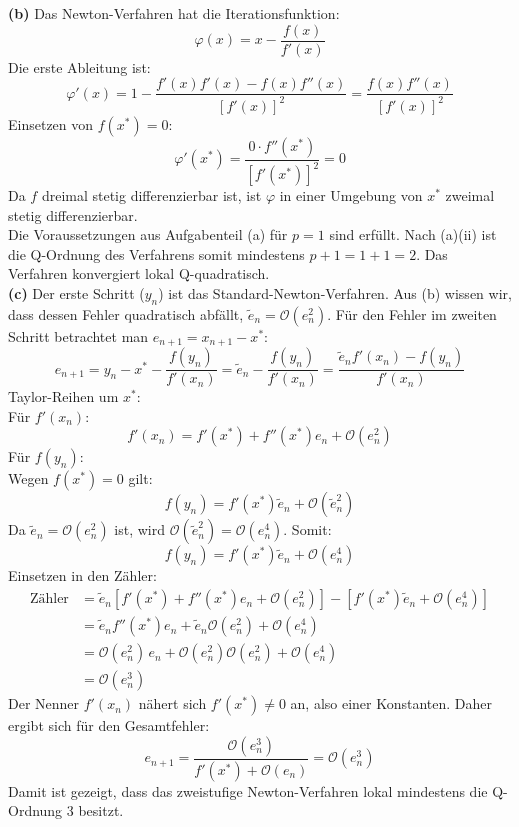 \documentclass[a4paper,12pt]{article}
\begin{document}
\bigskip
\noindent\textbf{(b)}
Das Newton-Verfahren hat die Iterationsfunktion:$$\varphi(x) = x - \frac{f(x)}{f'(x)}$$
Die erste Ableitung ist:
$$\varphi'(x) = 1 - \frac{f'(x)f'(x) - f(x)f''(x)}{[f'(x)]^2} = \frac{f(x)f''(x)}{[f'(x)]^2}$$
Einsetzen von $f(x^*) = 0$:
$$\varphi'(x^*) = \frac{0 \cdot f''(x^*)}{[f'(x^*)]^2} = 0$$
Da $f$ dreimal stetig differenzierbar ist, ist $\varphi$ in einer Umgebung von $x^*$ zweimal stetig differenzierbar. \\ 
Die Voraussetzungen aus Aufgabenteil (a) für $p=1$ sind erfüllt. Nach (a)(ii) ist die Q-Ordnung des Verfahrens somit mindestens $p+1 = 1+1 = 2$. Das Verfahren konvergiert lokal Q-quadratisch. \\

\bigskip
\noindent\textbf{(c)}
Der erste Schritt ($y_n$) ist das Standard-Newton-Verfahren. Aus (b) wissen wir, dass dessen Fehler quadratisch abfällt, $\tilde{e}_n = \mathcal{O}(e_n^2)$.
Für den Fehler im zweiten Schritt betrachtet man $e_{n+1} = x_{n+1} - x^*$:$$e_{n+1} = y_n - x^* - \frac{f(y_n)}{f'(x_n)} = \tilde{e}_n - \frac{f(y_n)}{f'(x_n)} = \frac{\tilde{e}_n f'(x_n) - f(y_n)}{f'(x_n)}$$
Taylor-Reihen um $x^*$: \\
Für $f'(x_n)$:\\
$$f'(x_n) = f'(x^*) + f''(x^*)e_n + \mathcal{O}(e_n^2)$$
Für $f(y_n)$:\\
Wegen $f(x^*) = 0$ gilt:
$$f(y_n) = f'(x^*)\tilde{e}_n + \mathcal{O}(\tilde{e}_n^2)$$
Da $\tilde{e}_n = \mathcal{O}(e_n^2)$ ist, wird $\mathcal{O}(\tilde{e}_n^2) = \mathcal{O}(e_n^4)$. Somit:
$$f(y_n) = f'(x^*)\tilde{e}_n + \mathcal{O}(e_n^4)$$
Einsetzen in den Zähler:
\begin{align*}
\text{Zähler} &= \tilde{e}_n \left[ f'(x^*) + f''(x^*)e_n + \mathcal{O}(e_n^2) \right] - \left[ f'(x^*)\tilde{e}_n + \mathcal{O}(e_n^4) \right] \\
&= \tilde{e}_n f''(x^*)e_n + \tilde{e}_n \mathcal{O}(e_n^2) + \mathcal{O}(e_n^4) \\
 &= \mathcal{O}(e_n^2)\,e_n + \mathcal{O}(e_n^2)\mathcal{O}(e_n^2) + \mathcal{O}(e_n^4) \\
 &= \mathcal{O}(e_n^3)
\end{align*}
Der Nenner $f'(x_n)$ nähert sich $f'(x^*) \neq 0$ an, also einer Konstanten. Daher ergibt sich für den Gesamtfehler:$$e_{n+1} = \frac{\mathcal{O}(e_n^3)}{f'(x^*) + \mathcal{O}(e_n)} = \mathcal{O}(e_n^3)$$
Damit ist gezeigt, dass das zweistufige Newton-Verfahren lokal mindestens die Q-Ordnung 3 besitzt.
\end{document}

